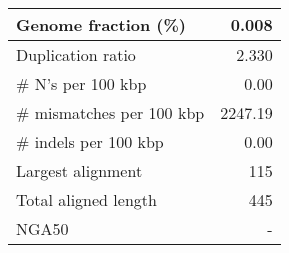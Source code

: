 \documentclass[12pt,a4paper]{article}
\begin{document}
\begin{table}[ht]
\begin{center}
\begin{tabular}{|l*{1}{|r}|}
Genome fraction (\%) & 0.008 \\ \hline
Duplication ratio & 2.330 \\ \hline
\# N's per 100 kbp & 0.00 \\ \hline
\# mismatches per 100 kbp & 2247.19 \\ \hline
\# indels per 100 kbp & 0.00 \\ \hline
Largest alignment & 115 \\ \hline
Total aligned length & 445 \\ \hline
NGA50 & - \\ \hline
\end{tabular}
\end{center}
\end{table}
\end{document}

